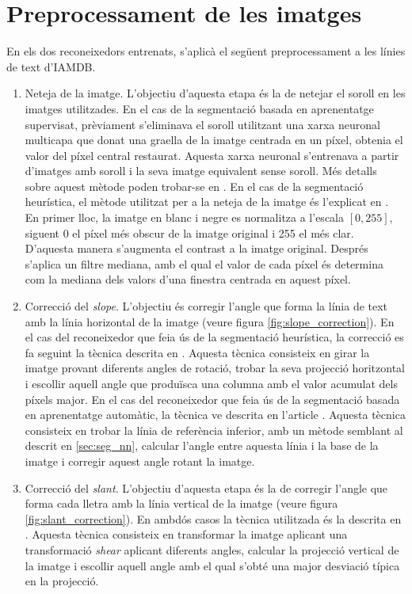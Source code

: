 \section{Preprocessament de les imatges}
En els dos reconeixedors entrenats, s'aplicà el següent preprocessament a les línies de text d'IAMDB.
\begin{enumerate}
\item Neteja de la imatge. L'objectiu d'aquesta etapa és la de netejar el soroll en les imatges utilitzades. En el cas de la segmentació basada en aprenentatge supervisat, prèviament s'eliminava el soroll utilitzant una xarxa neuronal multicapa que donat una graella de la imatge centrada en un píxel, obtenia el valor del píxel central restaurat. Aquesta xarxa neuronal s'entrenava a partir d'imatges amb soroll i la seva imatge equivalent sense soroll. Més detalls sobre aquest mètode poden trobar-se en \cite{DBLP:conf/pris/Gorbe-MoyaEZB08,espana2011improving}. En el cas de la segmentació heurística, el mètode utilitzat per a la neteja de la imatge és l'explicat en \cite{Pastor07}. En primer lloc, la imatge en blanc i negre es normalitza a l'escala $[0,255]$, siguent 0 el píxel més obscur de la imatge original i 255 el més clar. D'aquesta manera s'augmenta el contrast a la imatge original. Després s'aplica un filtre mediana, amb el qual el valor de cada píxel és determina com la mediana dels valors d'una finestra centrada en aquest píxel.

\item Correcció del \emph{slope}. L'objectiu és corregir l'angle que forma la línia de text amb la línia horizontal de la imatge (veure figura \ref{fig:slope_correction}). En el cas del reconeixedor que feia ús de la segmentació heurística, la correcció es fa seguint la tècnica descrita en \cite{Pastor07}. Aquesta tècnica consisteix en girar la imatge provant diferents angles de rotació, trobar la seva projecció horitzontal i escollir aquell angle que produïsca una columna amb el valor acumulat dels píxels major. En el cas del reconeixedor que feia ús de la segmentació basada en aprenentatge automàtic, la tècnica ve descrita en l'article \cite{DBLP:conf/pris/Gorbe-MoyaEZB08}. Aquesta tècnica consisteix en trobar la línia de referència inferior, amb un mètode semblant al descrit en \ref{sec:seg_nn}, calcular l'angle entre aquesta línia i la base de la imatge i corregir aquest angle rotant la imatge.

\item Correcció del \emph{slant}. L'objectiu d'aquesta etapa és la de corregir l'angle que forma cada lletra amb la línia vertical de la imatge (veure figura \ref{fig:slant_correction}). En ambdós casos la tècnica utilitzada és la descrita en \cite{pastor2004projection,Romero05,Pastor07}. Aquesta tècnica consisteix en transformar la imatge aplicant una transformació \emph{shear} aplicant diferents angles, calcular la projecció vertical de la imatge i escollir aquell angle amb el qual s'obté una major desviació típica en la projecció.


\end{enumerate}
